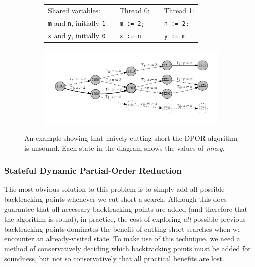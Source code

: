 \documentclass[12pt,a4paper,twoside,openright]{report}
\begin{document}
\begin{figure}
	\begin{subfigure}{\textwidth}
		\begin{tabular}{lp{1cm}lp{0cm}l}
		Shared variables: &&Thread 0: &&Thread 1: \\
		\qquad \texttt{m} and \texttt{n}, initially \texttt{1}
			&&\qquad\texttt{m := 2;}
			&& \qquad\texttt{n := 2;} \\
		\qquad \texttt{x} and \texttt{y}, initially \texttt{0}
			&&\qquad\texttt{x := n}
			&& \qquad\texttt{y := m}
		\end{tabular}
	\end{subfigure}
	\begin{subfigure}{\textwidth}
		\includegraphics[width=\textwidth]{sdpor}
	\end{subfigure}
	\caption[An example illustrating the need for the
		Stateful DPOR algorithm.]
		{An example showing that na\"{\i}vely
		cutting short the DPOR algorithm is
		unsound. Each state in the diagram shows
	the values of \textit{mnxy}.}
	\label{fig:sdpor-motivation}
\end{figure}

\subsubsection{Stateful Dynamic Partial-Order Reduction}
The most obvious solution to this problem is to simply
add all possible backtracking points whenever we cut
short a search. Although this does guarantee that all
necessary backtracking points are added (and therefore
that the algorithm is sound), in practice, the cost
of exploring \emph{all} possible previous backtracking points
dominates the benefit of cutting short searches when we
encounter an already-visited state. To make use of this
technique, we need a method of conservatively deciding which
backtracking points must be added for soundness, but not
so conservatively that all practical benefits are lost.
\end{document}

